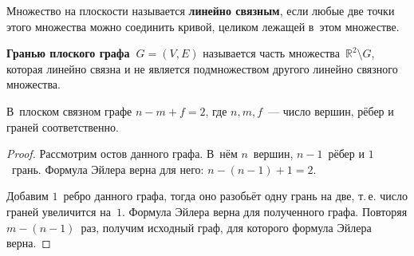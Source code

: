 \begin{center}
\noindent
{}
\end{center}

Множество на плоскости называется \textbf{линейно связным}, если любые две точки этого множества можно соединить кривой, целиком лежащей в~этом множестве.

 \textbf{Гранью плоского графа~$G = (V, E)$} называется часть множества~$\mathbb R^2 \setminus G$, которая линейно связна и не является подмножеством другого линейно связного множества.

\begin{theorem}
В~плоском связном графе $n - m + f = 2$, где $n, m, f$~--- число вершин, рёбер и граней соответственно.
\end{theorem}
\begin{proof}
Рассмотрим остов данного графа.
В~нём $n$~вершин, $n - 1$~рёбер и $1$~грань.
Формула Эйлера верна для него: $n - (n - 1) + 1 = 2$.

Добавим $1$~ребро данного графа, тогда оно разобьёт одну грань на две, т.\,е. число граней увеличится на~$1$.
Формула Эйлера верна для полученного графа.
Повторяя $m - (n - 1)$~раз, получим исходный граф, для которого формула Эйлера верна.
\end{proof}

